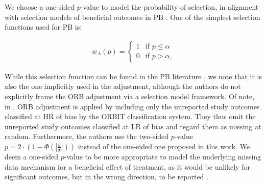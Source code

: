 \documentclass[twocolumn]{article}\usepackage[]{graphicx}\usepackage[]{xcolor}
\newcommand{\abs}[1]{\left\lvert#1\right\rvert} %
\providecommand{\DIFaddend}{} %
\DeclareRobustCommand{\DIFaddend}{\DIFOaddend \let\includegraphics\DIFOincludegraphics} %
\begin{document}
\DIFaddend We choose a one-sided $p$-value to model the probability of selection, in alignment with selection models of beneficial outcomes in PB \citep{HedgesVev, reviewselection, selectionCont}. One of the simplest selection functions used for PB is:


\begin{equation}
\begin{aligned}
\label{sel0}
w_A(p)= \begin{cases} 1 & \text{if } p \leq \alpha  \\
0 & \text{if } p > \alpha \text{,} \end{cases}
\end{aligned}
\end{equation}



While this selection function can be found in the PB literature \citep{selection0, selection1, reviewselection}, we note that it is also the one implicitly used in the \citet{Copas2019} adjustment, although the authors do not explicitly frame the ORB adjustment via a selection model framework. Of note, in \citet{Copas2019}, ORB adjustment is applied by including only the unreported study outcomes classified at HR of bias by the ORBIT classification system. They thus omit the unreported study outcomes classified at LR of bias and regard them as missing at random. Furthermore, the authors use the two-sided $p$-value $p = 2 \cdot (1 - \Phi(\abs{\frac{y}{\sigma}}))$ instead of the one-sided one proposed in this work. We deem a one-sided $p$-value to be more appropriate to model the underlying missing data mechanism for a beneficial effect of treatment, as it would be unlikely for significant outcomes, but in the wrong direction, to be reported \citep{HedgesVev, reviewselection, selectionCont}. 

\end{document}
